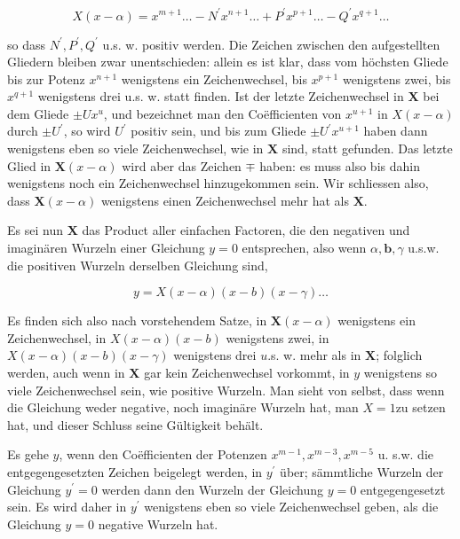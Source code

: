 \documentclass[twoside,12pt, showframe]{memoir}
\begin{document}
\[
X(x-\alpha)=x^{m+1} \ldots-N^{\prime} x^{n+1} \ldots+P^{\prime} x^{p+1} \ldots-Q^{\prime} x^{q+1} \ldots
\]

so dass \(N^{\prime}, P^{\prime}, Q^{\prime}\) u.s. w. positiv werden. Die Zeichen zwischen den aufgestellten Gliedern bleiben zwar unentschieden: allein es ist klar, dass vom höchsten Gliede bis zur Potenz \(x^{n+1}\) wenigstens ein Zeichenwechsel, bis \(x^{p+1}\) wenigstens zwei, bis \(x^{q+1}\) wenigstens drei u.s. w. statt finden. Ist der letzte Zeichenwechsel in \(\boldsymbol{X}\) bei dem Gliede \(\pm U x^{u}\), und bezeichnet man den Coëfficienten von \(x^{u+1}\) in \(X(x-\alpha)\) durch \(\pm U^{\prime}\), so wird \(U^{\prime}\) positiv sein, und bis zum Gliede \(\pm U^{\prime} x^{u+1}\) haben dann wenigstens eben so viele Zeichenwechsel, wie in \(\mathbf{X}\) sind, statt gefunden. Das letzte Glied in \(\boldsymbol{X}(x-\alpha)\) wird aber das Zeichen \(\mp\) haben: es muss also bis dahin wenigstens noch ein Zeichenwechsel hinzugekommen sein. Wir schliessen also, dass \(\boldsymbol{X}(x-\alpha)\) wenigstens einen Zeichenwechsel mehr hat als \(\boldsymbol{X}\).

Es sei nun \(\boldsymbol{X}\) das Product aller einfachen Factoren, die den negativen und imaginären Wurzeln einer Gleichung \(y=0\) entsprechen, also wenn \(\alpha, \boldsymbol{b}, \gamma\) u.s.w. die positiven Wurzeln derselben Gleichung sind,

\[
y=X(x-\alpha)(x-b)(x-\gamma) \ldots
\]

Es finden sich also nach vorstehendem Satze, in \(\boldsymbol{X}(x-\alpha)\) wenigstens ein Zeichenwechsel, in \(X(x-\alpha)(x-b)\) wenigstens zwei, in \(X(x-\alpha)(x-b)(x-\gamma)\) wenigstens drei \(u\).s. w. mehr als in \(\boldsymbol{X}\); folglich werden, auch wenn in \(\boldsymbol{X}\) gar kein Zeichenwechsel vorkommt, in \(y\) wenigstens so viele Zeichenwechsel sein, wie positive Wurzeln. Man sieht von selbst, dass wenn die Gleichung weder negative, noch imaginäre Wurzeln hat, man \(X=1 \mathrm{zu}\) setzen hat, und dieser Schluss seine Gültigkeit behält.

Es gehe \(y\), wenn den Coëfficienten der Potenzen \(x^{m-1}, x^{m-3}, x^{m-5}\) u. s.w. die entgegengesetzten Zeichen beigelegt werden, in \(y^{\prime}\) über; sämmtliche Wurzeln der Gleichung \(y^{\prime}=0\) werden dann den Wurzeln der Gleichung \(y=0\) entgegengesetzt sein. Es wird daher in \(y^{\prime}\) wenigstens eben so viele Zeichenwechsel geben, als die Gleichung \(y=0\) negative Wurzeln hat.
\end{document}
